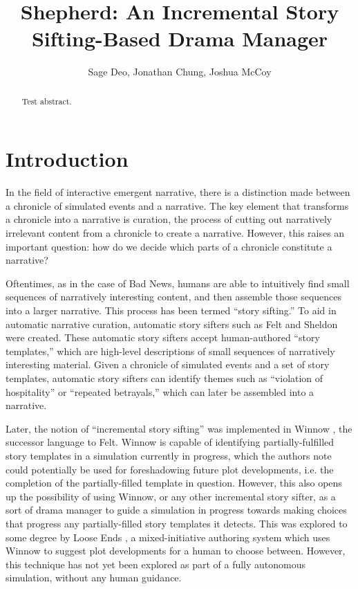 \documentclass[letterpaper]{article}
\title{Shepherd: An Incremental Story Sifting-Based Drama Manager}
\author {
    Sage Deo,
    Jonathan Chung,
    Joshua McCoy
}
\begin{document}
\maketitle

\begin{abstract}
    Test abstract.
\end{abstract}

\section{Introduction}
In the field of interactive emergent narrative, there is a distinction made between a
chronicle of simulated events and a narrative. The key element that transforms a chronicle
into a narrative is curation, the process of cutting out narratively irrelevant content
from a chronicle to create a narrative. However, this raises an important question: how do
we decide which parts of a chronicle constitute a narrative?

Oftentimes, as in the case of Bad News, humans are able to intuitively find small
sequences of narratively interesting content, and then assemble those sequences into a
larger narrative. This process has been termed “story sifting.” To aid in automatic
narrative curation, automatic story sifters such as Felt \cite{kreminski:felt} and Sheldon
\cite{ryan:curating} were created. These
automatic story sifters accept human-authored “story templates,” which are high-level
descriptions of small sequences of narratively interesting material. Given a chronicle of
simulated events and a set of story templates, automatic story sifters can identify themes
such as “violation of hospitality” or “repeated betrayals,” which can later be assembled
into a narrative. 

Later, the notion of “incremental story sifting” was implemented in Winnow
\cite{kreminski:winnow}, the successor
language to Felt. Winnow is capable of identifying partially-fulfilled story templates in
a simulation currently in progress, which the authors note could potentially be used for
foreshadowing future plot developments, i.e. the completion of the partially-filled
template in question. However, this also opens up the possibility of using Winnow, or any
other incremental story sifter, as a sort of drama manager to guide a simulation in
progress towards making choices that progress any partially-filled story templates it
detects. This was explored to some degree by Loose Ends \cite{kreminski:loose}, a mixed-initiative authoring
system which uses Winnow to suggest plot developments for a human to choose between.
However, this technique has not yet been explored as part of a fully autonomous
simulation, without any human guidance. 
\end{document}
